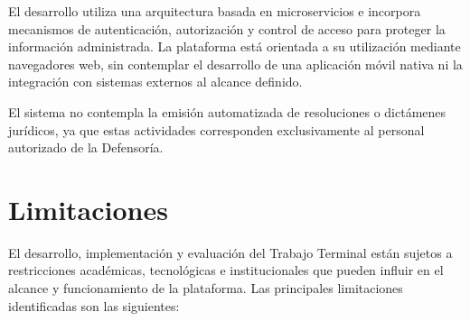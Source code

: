 El desarrollo utiliza una arquitectura basada en microservicios e incorpora mecanismos de autenticación, autorización y control de acceso para proteger la información administrada. La plataforma está orientada a su utilización mediante navegadores web, sin contemplar el desarrollo de una aplicación móvil nativa ni la integración con sistemas externos al alcance definido.

El sistema no contempla la emisión automatizada de resoluciones o dictámenes jurídicos, ya que estas actividades corresponden exclusivamente al personal autorizado de la Defensoría.
	
	\section{Limitaciones}
	\label{sec:limitaciones}

	El desarrollo, implementación y evaluación del Trabajo Terminal están sujetos a restricciones académicas, tecnológicas e institucionales que pueden influir en el alcance y funcionamiento de la plataforma. Las principales limitaciones identificadas son las siguientes:


